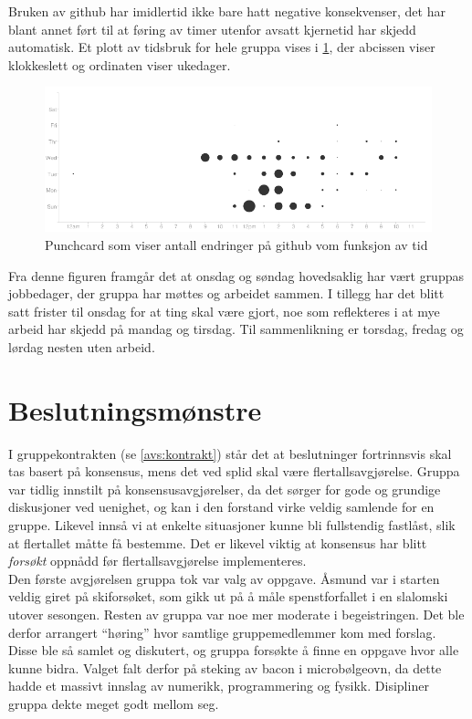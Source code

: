 Bruken av github har imidlertid ikke bare hatt negative konsekvenser, det har blant annet
ført til at føring av timer utenfor avsatt kjernetid har skjedd automatisk. Et
plott av tidsbruk for hele gruppa vises i \cref{fig:punchcard}, der abcissen
viser klokkeslett og ordinaten viser ukedager.
\begin{figure}[H]
  \begin{center}
    \includegraphics[width=\textwidth]{punchcard.png}
  \end{center}
  \caption{Punchcard som viser antall endringer på github vom funksjon av tid}
  \label{fig:punchcard}
\end{figure}
Fra denne figuren framgår det at onsdag og søndag hovedsaklig har vært gruppas
jobbedager, der gruppa har møttes og arbeidet sammen. I tillegg har det blitt satt
frister til onsdag for at ting skal være gjort, noe som reflekteres i at mye
arbeid har skjedd på mandag og tirsdag. Til sammenlikning er torsdag, fredag og
lørdag nesten uten arbeid.\\

\section{Beslutningsmønstre}
I gruppekontrakten (se \cref{avs:kontrakt}) står det at beslutninger fortrinnsvis
skal tas basert på konsensus, mens det ved splid skal være flertallsavgjørelse.
Gruppa var tidlig innstilt på konsensusavgjørelser, da det sørger for gode og
grundige diskusjoner ved uenighet, og kan i den forstand virke veldig samlende
for en gruppe. Likevel innså vi at enkelte situasjoner kunne bli fullstendig
fastlåst, slik at flertallet måtte få bestemme. Det er likevel viktig at
konsensus har blitt \emph{forsøkt} oppnådd før flertallsavgjørelse
implementeres. \\

Den første avgjørelsen gruppa tok var valg av oppgave. Åsmund var i starten
veldig giret på skiforsøket, som gikk ut på å måle spenstforfallet i en
slalomski utover sesongen. Resten av gruppa var noe mer moderate i
begeistringen. Det ble derfor arrangert ``høring'' hvor samtlige gruppemedlemmer
kom med forslag. Disse ble så samlet og diskutert, og gruppa forsøkte å finne en
oppgave hvor alle kunne bidra. Valget falt derfor på steking av bacon i
microbølgeovn, da dette hadde et massivt innslag av numerikk, programmering og
fysikk. Disipliner gruppa dekte meget godt mellom seg. \\

